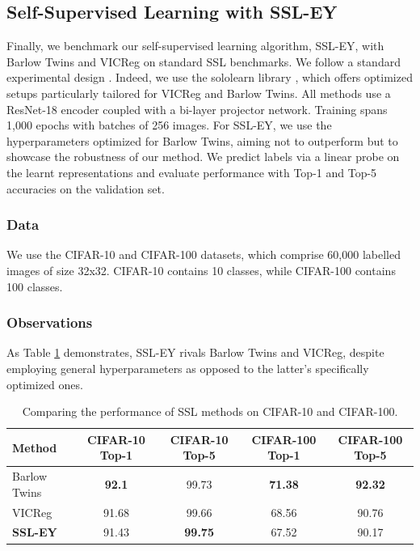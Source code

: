 \subsection{Self-Supervised Learning with SSL-EY}
Finally, we benchmark our self-supervised learning algorithm, SSL-EY, with Barlow Twins and VICReg on standard SSL benchmarks.
We follow a standard experimental design \citep{tong2023emp}.
Indeed, we use the sololearn library \citep{da2022solo}, which offers optimized setups particularly tailored for VICReg and Barlow Twins.
All methods use a ResNet-18 encoder coupled with a bi-layer projector network.
Training spans 1,000 epochs with batches of 256 images.
For SSL-EY, we use the hyperparameters optimized for Barlow Twins, aiming not to outperform but to showcase the robustness of our method.
We predict labels via a linear probe on the learnt representations and evaluate performance with Top-1 and Top-5 accuracies on the validation set.

\subsubsection{Data} We use the CIFAR-10 and CIFAR-100 datasets, which comprise 60,000 labelled images of size 32x32.
CIFAR-10 contains 10 classes, while CIFAR-100 contains 100 classes.

\subsubsection{Observations} As Table \ref{tab:selfsup} demonstrates, SSL-EY rivals Barlow Twins and VICReg, despite employing general hyperparameters as opposed to the latter's specifically optimized ones.

\begin{table}[H]
    \centering
    \begin{tabular}{|l|c|c|c|c|}
        \hline
        Method          & CIFAR-10 Top-1 & CIFAR-10 Top-5 & CIFAR-100 Top-1 & CIFAR-100 Top-5 \\
        \hline
        Barlow Twins    & \textbf{92.1}  & 99.73          & \textbf{71.38}  & \textbf{92.32}  \\
        VICReg          & 91.68          & 99.66          & 68.56           & 90.76           \\
        \textbf{SSL-EY} & 91.43          & \textbf{99.75} & 67.52           & 90.17           \\
        \hline
    \end{tabular}
    \caption{Comparing the performance of SSL methods on CIFAR-10 and CIFAR-100.}
    \label{tab:selfsup}
\end{table}

